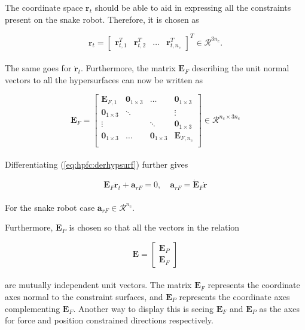 
The coordinate space $\mathbf{r}_t$ should be able to aid in expressing all the constraints present on the snake robot. Therefore, it is chosen as 

\begin{equation}
    \mathbf{r}_t = 
    \begin{bmatrix}
        \mathbf{r}_{t,1}^T & \mathbf{r}_{t,2}^T & \dots &\mathbf{r}_{t,n_c}^T
    \end{bmatrix}^T \in \mathcal{R}^{3 n_c}.
\end{equation}
\\
The same goes for $\dot{\mathbf{r}}_t$. Furthermore, the matrix $\mathbf{E}_{F}$ describing the unit normal vectors to all the hypersurfaces can now be written as

\begin{equation}
    \mathbf{E}_F = 
    \begin{bmatrix}
        \mathbf{E}_{F,1} & \mathbf{0}_{1\times3} & \dots & \mathbf{0}_{1\times3} \\
        \mathbf{0}_{1\times3} & \ddots & & \vdots \\
        \vdots & & \ddots & \mathbf{0}_{1\times3} \\
        \mathbf{0}_{1\times3} & \dots & \mathbf{0}_{1\times3} & \mathbf{E}_{F,n_c} \\
    \end{bmatrix} \in \mathcal{R}^{n_c \times 3 n_c}
\end{equation}
\\

Differentiating (\ref{eq:hpfc:derhypsurf}) further gives

\begin{equation}\label{eq:dhpfc_arf}
    \mathbf{E}_F \mathbf{\ddot{r}}_t + \mathbf{a}_{r F} = 0, \quad \mathbf{a}_{r F} = \mathbf{\dot{E}}_F\mathbf{\dot{r}}
\end{equation}
\\
For the snake robot case $\mathbf{a}_{r F} \in \mathcal{R}^{n_c}$.

Furthermore, $\mathbf{E}_P$ is chosen so that all the vectors in the relation

\begin{equation}\label{eq:dhpfc_E}
    \mathbf{E} =
    \begin{bmatrix}
    \mathbf{E}_P \\ \mathbf{E}_F
    \end{bmatrix}
\end{equation}
\\
are mutually independent unit vectors. The matrix $\mathbf{E}_F$ represents the coordinate axes normal to the constraint surfaces, and $\mathbf{E}_P$ represents the coordinate axes complementing $\mathbf{E}_F$. Another way to display this is seeing $\mathbf{E}_F$ and $\mathbf{E}_P$ as the axes for force and position constrained directions respectively.

